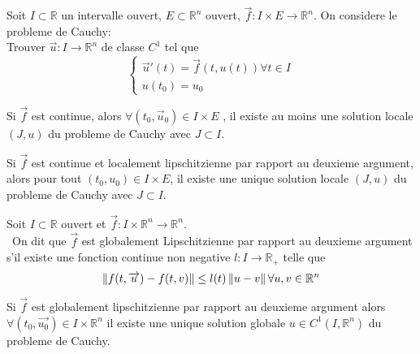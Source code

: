 \documentclass[../main.tex]{subfiles}
\begin{document}
Soit $I \subset \mathbb{R}$ un intervalle ouvert, $E \subset \mathbb{R}^n$ ouvert, $\vec{f}: I \times E \to \mathbb{R}^{n}$. On considere le probleme de Cauchy:\\
Trouver $\vec{u} : I \to \mathbb{R}^{n}$ de classe $C^{1}$ tel que
\[ 
	\begin{cases}
	\vec{u}'( t) = \vec{f}( t,u( t) ) \forall t \in I\\
	u( t_0) = u_0
	\end{cases}
\]
\begin{thm}
	Si $\vec{f}$ est continue, alors $\forall ( t_0, \vec{u}_0) \in I \times E$ , il existe au moins une solution locale $( J,u) $ du probleme de Cauchy avec $J \subset I$.
\end{thm}
\begin{thm}
	Si $\vec{f}$ est continue et localement lipschitzienne par rapport au deuxieme argument, alors pour tout $ ( t_0, u_0) \in I \times E$, il existe une unique solution locale $ ( J,u) $ du probleme de Cauchy avec $J \subset I$.	
\end{thm}
\begin{defn}
Soit $I \subset \mathbb{R}$ ouvert et $\vec{f} : I \times \mathbb{R}^{n}\to \mathbb{R}^n$.\\\
On dit que $\vec{f}$ est globalement Lipschitzienne par rapport au deuxieme argument s'il existe une fonction continue non negative $l : I \to \mathbb{R}_+$ telle que
\[ 
	\left\lVert f( t,\overrightarrow{u}) - f( t,v) \right\rVert \leq  l( t) \left\lVert u -v\right\rVert  \forall u,v \in \mathbb{R}^n
\]
\end{defn}
\begin{thm}
	Si $\vec{f}$ est globalement lipschitzienne par rapport au deuxieme argument alors $\forall ( t_0, \vec{u_0}) \in I \times \mathbb{R}^n$ il existe une unique solution globale $u \in C^{1}( I, \mathbb{R}^n) $ du probleme de Cauchy.
\end{thm}
\end{document}

